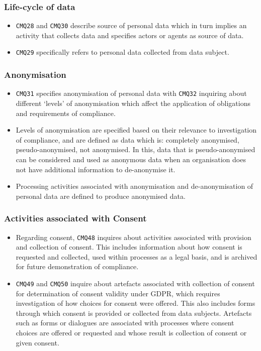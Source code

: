\subsubsection{Life-cycle of data}
\begin{itemize}
    \item \texttt{CMQ28} and \texttt{CMQ30} describe source of personal data which in turn implies an activity that collects data and specifies actors or agents as source of data.
    \item \texttt{CMQ29} specifically refers to personal data collected from data subject.
\end{itemize}

\subsubsection{Anonymisation}
\begin{itemize}
    \item \texttt{CMQ31} specifies anonymisation of personal data with \texttt{CMQ32} inquiring about different `levels' of anonymisation which affect the application of obligations and requirements of compliance. 
    \item Levels of anonymisation are specified based on their relevance to investigation of compliance, and are defined as data which is: completely anonymised, pseudo-anonymised, not anonymised. In this, data that is pseudo-anonymised can be considered and used as anonymous data when an organisation does not have additional information to de-anonymise it. 
    \item Processing activities associated with anonymisation and de-anonymisation of personal data are defined to produce anonymised data.
\end{itemize}

\subsubsection{Activities associated with Consent}
\begin{itemize}
    \item Regarding consent, \texttt{CMQ48} inquires about activities associated with provision and collection of consent. This includes information about how consent is requested and collected, used within processes as a legal basis, and is archived for future demonstration of compliance.
    \item \texttt{CMQ49} and \texttt{CMQ50} inquire about artefacts associated with collection of consent for determination of consent validity under GDPR, which requires investigation of how choices for consent were offered. This also includes forms through which consent is provided or collected from data subjects. Artefacts such as forms or dialogues are associated with processes where consent choices are offered or requested and whose result is collection of consent or given consent.
\end{itemize}

